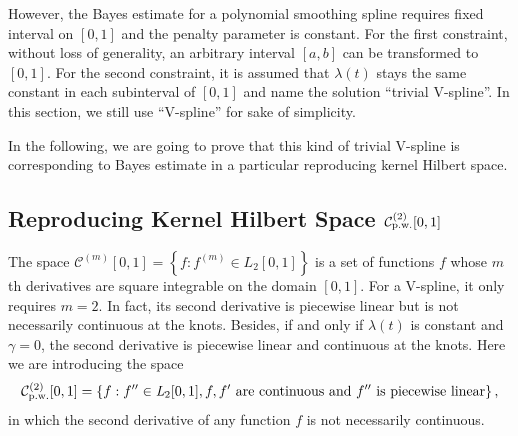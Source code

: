 However, the Bayes estimate for a polynomial smoothing spline requires fixed interval on $[0,1]$ and the penalty parameter is constant. For the first constraint, without loss of generality, an arbitrary interval $[a,b]$ can be transformed to $[0,1]$. For the second constraint, it is assumed that $\lambda(t)$ stays the same constant in each subinterval of $[0,1]$ and name the solution ``trivial V-spline''.  In this section, we still use ``V-spline'' for sake of simplicity. 

In the following, we are going to prove that this kind of trivial V-spline is corresponding to Bayes estimate in a particular reproducing kernel Hilbert space. 


\subsection{Reproducing Kernel Hilbert Space $\mathcal{C}_{\mbox{\scriptsize p.w.}}^{(2)}[0,1]$}

The space $\mathcal{C}^{(m)}[0,1]=\left\lbrace  f:f^{(m)}\in \mathit{L}_2[0,1] \right\rbrace$ is a set of functions $f$ whose $m$th derivatives are square integrable on the domain $[0,1]$. For a V-spline, it only requires $m=2$. In fact, its second derivative is piecewise linear but is not necessarily continuous at the knots. Besides, if and only if $\lambda(t)$ is constant and $\gamma=0$, the second derivative is piecewise linear and continuous at the knots. Here we are introducing the space 
\begin{equation*}
\mathcal{C}_{\mbox{\scriptsize p.w.}}^{(2)}[0,1]=\left\lbrace f: f''\in \mathit{L}_2[0,1], f,f' \mbox{ are continuous and } f'' \mbox{ is piecewise linear}\right\rbrace,
\end{equation*}
in which the second derivative of any function $f$ is not necessarily continuous. 


